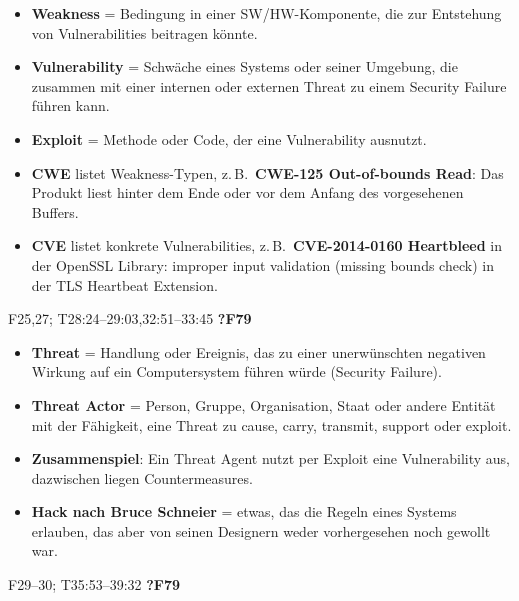 \documentclass[10pt,a4paper]{article}
\newcommand{\block}[2]{\par\vspace{3pt}{\bfseries #1}\hfill{\scriptsize #2}\par\nopagebreak}
\begin{document}
\begin{itemize}
\item \textbf{Weakness} = Bedingung in einer SW/HW-Komponente, die zur Entstehung von Vulnerabilities beitragen könnte.
\item \textbf{Vulnerability} = Schwäche eines Systems oder seiner Umgebung, die zusammen mit einer internen oder externen Threat zu einem Security Failure führen kann.
\item \textbf{Exploit} = Methode oder Code, der eine Vulnerability ausnutzt.
\item \textbf{CWE} listet Weakness-Typen, z.\,B.\ \textbf{CWE-125 Out-of-bounds Read}: Das Produkt liest hinter dem Ende oder vor dem Anfang des vorgesehenen Buffers.
\item \textbf{CVE} listet konkrete Vulnerabilities, z.\,B.\ \textbf{CVE-2014-0160 Heartbleed} in der OpenSSL Library: improper input validation (missing bounds check) in der TLS Heartbeat Extension.
\end{itemize}
\block{Threat, Threat Actor, Hack}{F25,27; T28:24--29:03,32:51--33:45 \quad \textbf{?F79}}
\begin{itemize}
\item \textbf{Threat} = Handlung oder Ereignis, das zu einer unerwünschten negativen Wirkung auf ein Computersystem führen würde (Security Failure).
\item \textbf{Threat Actor} = Person, Gruppe, Organisation, Staat oder andere Entität mit der Fähigkeit, eine Threat zu cause, carry, transmit, support oder exploit.
\item \textbf{Zusammenspiel}: Ein Threat Agent nutzt per Exploit eine Vulnerability aus, dazwischen liegen Countermeasures.
\item \textbf{Hack nach Bruce Schneier} = etwas, das die Regeln eines Systems erlauben, das aber von seinen Designern weder vorhergesehen noch gewollt war.
\end{itemize}
\block{Security Policy, Security Target, Protection Profile, Protection}{F29--30; T35:53--39:32 \quad \textbf{?F79}}
\end{document}
